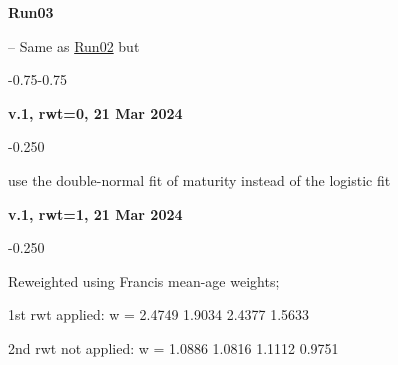 \hypertarget{R03}{\textbf{Run03}} -- Same as \hyperlink{R02}{Run02} but
\begin{itemize_csas}{-0.75}{-0.75}
	\item \textbf{v.1, rwt=0, 21 Mar 2024}
	\begin{itemize_csas}{-0.25}{0}
		\item use the double-normal fit of maturity instead of the logistic fit
	\end{itemize_csas}
	\item \textbf{v.1, rwt=1, 21 Mar 2024}
	\begin{itemize_csas}{-0.25}{0}
		\item Reweighted using Francis mean-age weights;
		\item 1st rwt applied: w =  2.4749 1.9034 2.4377 1.5633
		\item 2nd rwt not applied: w = 1.0886 1.0816 1.1112 0.9751
	\end{itemize_csas}
\end{itemize_csas}


